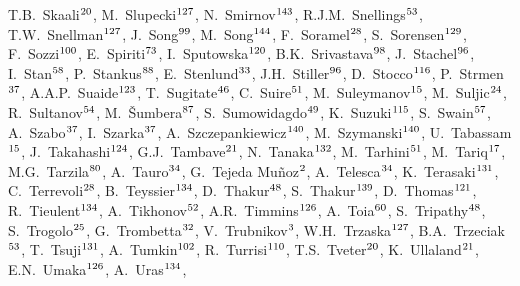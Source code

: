 \begin{flushleft}
T.B.~Skaali$^\textrm{\scriptsize 20}$,
M.~Slupecki$^\textrm{\scriptsize 127}$,
N.~Smirnov$^\textrm{\scriptsize 143}$,
R.J.M.~Snellings$^\textrm{\scriptsize 53}$,
T.W.~Snellman$^\textrm{\scriptsize 127}$,
J.~Song$^\textrm{\scriptsize 99}$,
M.~Song$^\textrm{\scriptsize 144}$,
F.~Soramel$^\textrm{\scriptsize 28}$,
S.~Sorensen$^\textrm{\scriptsize 129}$,
F.~Sozzi$^\textrm{\scriptsize 100}$,
E.~Spiriti$^\textrm{\scriptsize 73}$,
I.~Sputowska$^\textrm{\scriptsize 120}$,
B.K.~Srivastava$^\textrm{\scriptsize 98}$,
J.~Stachel$^\textrm{\scriptsize 96}$,
I.~Stan$^\textrm{\scriptsize 58}$,
P.~Stankus$^\textrm{\scriptsize 88}$,
E.~Stenlund$^\textrm{\scriptsize 33}$,
J.H.~Stiller$^\textrm{\scriptsize 96}$,
D.~Stocco$^\textrm{\scriptsize 116}$,
P.~Strmen$^\textrm{\scriptsize 37}$,
A.A.P.~Suaide$^\textrm{\scriptsize 123}$,
T.~Sugitate$^\textrm{\scriptsize 46}$,
C.~Suire$^\textrm{\scriptsize 51}$,
M.~Suleymanov$^\textrm{\scriptsize 15}$,
M.~Suljic$^\textrm{\scriptsize 24}$,
R.~Sultanov$^\textrm{\scriptsize 54}$,
M.~\v{S}umbera$^\textrm{\scriptsize 87}$,
S.~Sumowidagdo$^\textrm{\scriptsize 49}$,
K.~Suzuki$^\textrm{\scriptsize 115}$,
S.~Swain$^\textrm{\scriptsize 57}$,
A.~Szabo$^\textrm{\scriptsize 37}$,
I.~Szarka$^\textrm{\scriptsize 37}$,
A.~Szczepankiewicz$^\textrm{\scriptsize 140}$,
M.~Szymanski$^\textrm{\scriptsize 140}$,
U.~Tabassam$^\textrm{\scriptsize 15}$,
J.~Takahashi$^\textrm{\scriptsize 124}$,
G.J.~Tambave$^\textrm{\scriptsize 21}$,
N.~Tanaka$^\textrm{\scriptsize 132}$,
M.~Tarhini$^\textrm{\scriptsize 51}$,
M.~Tariq$^\textrm{\scriptsize 17}$,
M.G.~Tarzila$^\textrm{\scriptsize 80}$,
A.~Tauro$^\textrm{\scriptsize 34}$,
G.~Tejeda Mu\~{n}oz$^\textrm{\scriptsize 2}$,
A.~Telesca$^\textrm{\scriptsize 34}$,
K.~Terasaki$^\textrm{\scriptsize 131}$,
C.~Terrevoli$^\textrm{\scriptsize 28}$,
B.~Teyssier$^\textrm{\scriptsize 134}$,
D.~Thakur$^\textrm{\scriptsize 48}$,
S.~Thakur$^\textrm{\scriptsize 139}$,
D.~Thomas$^\textrm{\scriptsize 121}$,
R.~Tieulent$^\textrm{\scriptsize 134}$,
A.~Tikhonov$^\textrm{\scriptsize 52}$,
A.R.~Timmins$^\textrm{\scriptsize 126}$,
A.~Toia$^\textrm{\scriptsize 60}$,
S.~Tripathy$^\textrm{\scriptsize 48}$,
S.~Trogolo$^\textrm{\scriptsize 25}$,
G.~Trombetta$^\textrm{\scriptsize 32}$,
V.~Trubnikov$^\textrm{\scriptsize 3}$,
W.H.~Trzaska$^\textrm{\scriptsize 127}$,
B.A.~Trzeciak$^\textrm{\scriptsize 53}$,
T.~Tsuji$^\textrm{\scriptsize 131}$,
A.~Tumkin$^\textrm{\scriptsize 102}$,
R.~Turrisi$^\textrm{\scriptsize 110}$,
T.S.~Tveter$^\textrm{\scriptsize 20}$,
K.~Ullaland$^\textrm{\scriptsize 21}$,
E.N.~Umaka$^\textrm{\scriptsize 126}$,
A.~Uras$^\textrm{\scriptsize 134}$,

\end{flushleft}
